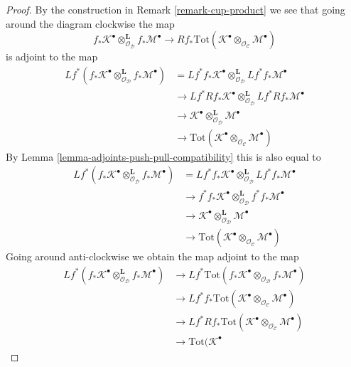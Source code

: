 \begin{proof}
By the construction in Remark \ref{remark-cup-product} we see that
going around the diagram clockwise the map
$$
f_*\mathcal{K}^\bullet
\otimes_{\mathcal{O}_\mathcal{D}}^\mathbf{L}
f_*\mathcal{M}^\bullet 
\longrightarrow
Rf_*\text{Tot}(\mathcal{K}^\bullet
\otimes_{\mathcal{O}_\mathcal{C}}
\mathcal{M}^\bullet)
$$
is adjoint to the map
\begin{align*}
Lf^*(f_*\mathcal{K}^\bullet
\otimes_{\mathcal{O}_\mathcal{D}}^\mathbf{L}
f_*\mathcal{M}^\bullet)
& =
Lf^*f_*\mathcal{K}^\bullet
\otimes_{\mathcal{O}_\mathcal{D}}^\mathbf{L}
Lf^*f_*\mathcal{M}^\bullet \\
& \to
Lf^*Rf_*\mathcal{K}^\bullet
\otimes_{\mathcal{O}_\mathcal{D}}^\mathbf{L}
Lf^*Rf_*\mathcal{M}^\bullet \\
& \to
\mathcal{K}^\bullet
\otimes_{\mathcal{O}_\mathcal{D}}^\mathbf{L}
\mathcal{M}^\bullet \\
& \to
\text{Tot}(\mathcal{K}^\bullet
\otimes_{\mathcal{O}_\mathcal{C}}
\mathcal{M}^\bullet)
\end{align*}
By Lemma \ref{lemma-adjoints-push-pull-compatibility} this is also equal to
\begin{align*}
Lf^*(f_*\mathcal{K}^\bullet
\otimes_{\mathcal{O}_\mathcal{D}}^\mathbf{L}
f_*\mathcal{M}^\bullet)
& =
Lf^*f_*\mathcal{K}^\bullet
\otimes_{\mathcal{O}_\mathcal{D}}^\mathbf{L}
Lf^*f_*\mathcal{M}^\bullet \\
& \to
f^*f_*\mathcal{K}^\bullet
\otimes_{\mathcal{O}_\mathcal{D}}^\mathbf{L}
f^*f_*\mathcal{M}^\bullet \\
& \to
\mathcal{K}^\bullet
\otimes_{\mathcal{O}_\mathcal{D}}^\mathbf{L}
\mathcal{M}^\bullet \\
& \to
\text{Tot}(\mathcal{K}^\bullet
\otimes_{\mathcal{O}_\mathcal{C}}
\mathcal{M}^\bullet)
\end{align*}
Going around anti-clockwise we obtain the map adjoint to the map
\begin{align*}
Lf^*(f_*\mathcal{K}^\bullet
\otimes_{\mathcal{O}_\mathcal{D}}^\mathbf{L}
f_*\mathcal{M}^\bullet)
& \to
Lf^*\text{Tot}(
f_*\mathcal{K}^\bullet
\otimes_{\mathcal{O}_\mathcal{D}}
f_*\mathcal{M}^\bullet) \\
& \to
Lf^*f_*\text{Tot}(\mathcal{K}^\bullet
\otimes_{\mathcal{O}_\mathcal{C}}
\mathcal{M}^\bullet) \\
& \to
Lf^*Rf_*\text{Tot}(\mathcal{K}^\bullet
\otimes_{\mathcal{O}_\mathcal{C}}
\mathcal{M}^\bullet) \\
& \to
\text{Tot}(\mathcal{K}^\bullet

\end{align*}
\end{proof}
